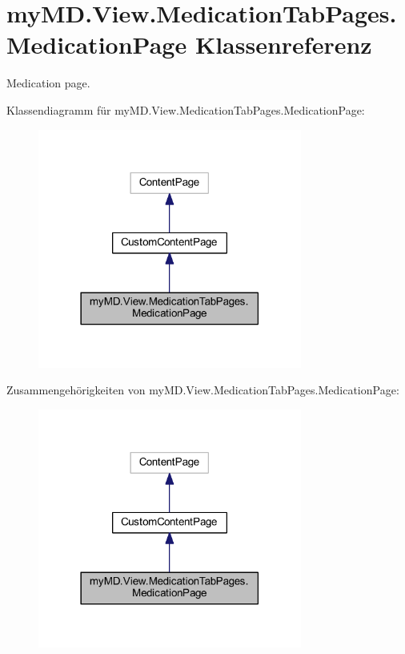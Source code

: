 \hypertarget{classmy_m_d_1_1_view_1_1_medication_tab_pages_1_1_medication_page}{}\section{my\+M\+D.\+View.\+Medication\+Tab\+Pages.\+Medication\+Page Klassenreferenz}
\label{classmy_m_d_1_1_view_1_1_medication_tab_pages_1_1_medication_page}


Medication page.  




Klassendiagramm für my\+M\+D.\+View.\+Medication\+Tab\+Pages.\+Medication\+Page\+:\nopagebreak
\begin{figure}[H]
\begin{center}
\leavevmode
\includegraphics[width=246pt]{classmy_m_d_1_1_view_1_1_medication_tab_pages_1_1_medication_page__inherit__graph}
\end{center}
\end{figure}


Zusammengehörigkeiten von my\+M\+D.\+View.\+Medication\+Tab\+Pages.\+Medication\+Page\+:\nopagebreak
\begin{figure}[H]
\begin{center}
\leavevmode
\includegraphics[width=246pt]{classmy_m_d_1_1_view_1_1_medication_tab_pages_1_1_medication_page__coll__graph}
\end{center}
\end{figure}
